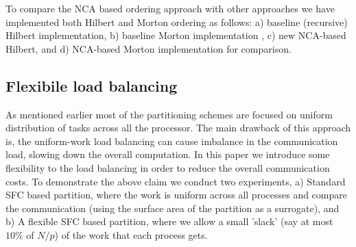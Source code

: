 \documentclass{sig-alternate}
\begin{document}
To compare the NCA based ordering approach with other approaches we have
implemented both Hilbert and Morton ordering as follows: a) baseline (recursive) Hilbert implementation, b) baseline Morton implementation \cite{sundar2007}, c) new NCA-based Hilbert, and d) NCA-based Morton implementation for comparison. 





\subsection{Flexibile load balancing}

As mentioned earlier most of the partitioning schemes are focused on uniform distribution of tasks across all the processor. The main drawback of this approach is, the uniform-work load balancing can cause
imbalance in the communication load, slowing down the overall computation. In this paper we introduce some flexibility to the load balancing in order to reduce the overall communication
costs. 
To demonstrate the above claim we conduct two experiments, a) Standard SFC based partition, where the work is uniform across all processes and compare the communication (using the surface area of the partition as a surrogate), and b) A flexible SFC based partition, where we allow a small 'slack' (say at most $10\%$ of $N/p$) of the work that each process gets. 
\end{document}
